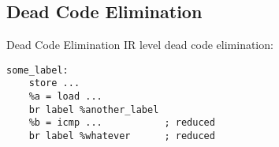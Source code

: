 \subsection{Dead Code Elimination}

\begin{frame}[fragile]{Dead Code Elimination}
    IR level dead code elimination:
    \begin{lstlisting}
some_label:
    store ...
    %a = load ...
    br label %another_label
    %b = icmp ...           ; reduced
    br label %whatever      ; reduced
    \end{lstlisting}
\end{frame}